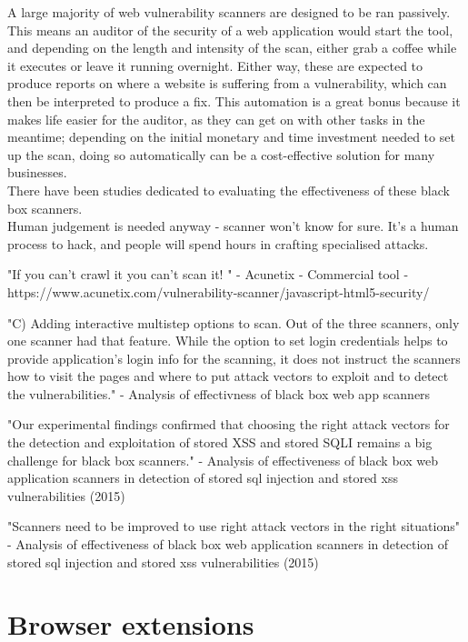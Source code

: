 A large majority of web vulnerability scanners are designed to be ran passively. This means an auditor of the security of a web application would start the tool, and depending on the length and intensity of the scan, either grab a coffee while it executes or leave it running overnight. Either way, these are expected to produce reports on where a website is suffering from a vulnerability, which can then be interpreted to produce a fix. This automation is a great bonus because it makes life easier for the auditor, as they can get on with other tasks in the meantime; depending on the initial monetary and time investment needed to set up the scan, doing so automatically can be a cost-effective solution for many businesses. \\

There have been studies dedicated to evaluating the effectiveness of these black box scanners. \\
 
 Human judgement is needed anyway - scanner won't know for sure. It's a human process to hack, and people will spend hours in crafting specialised attacks. 
 
 "If you can’t crawl it you can’t scan it! " - Acunetix - Commercial tool - https://www.acunetix.com/vulnerability-scanner/javascript-html5-security/
 
 
 "C) Adding interactive multistep options to scan. Out of the three scanners, only one scanner had that feature. While the option to set login credentials helps to provide application’s login info for the scanning, it does not instruct the scanners how to visit the pages and where to put attack vectors to exploit and to detect the vulnerabilities." - Analysis of effectivness of black box web app scanners 
 
 
 "Our experimental findings confirmed that choosing the right attack vectors for the detection and exploitation of stored XSS and stored SQLI remains a big challenge for black box scanners." - Analysis of effectiveness of black box web application scanners in detection of stored sql injection and stored xss vulnerabilities (2015)
 
 "Scanners need to be improved to use right attack vectors in the right situations" - Analysis of effectiveness of black box web application scanners in detection of stored sql injection and stored xss vulnerabilities (2015)
 
\section{Browser extensions}
 
